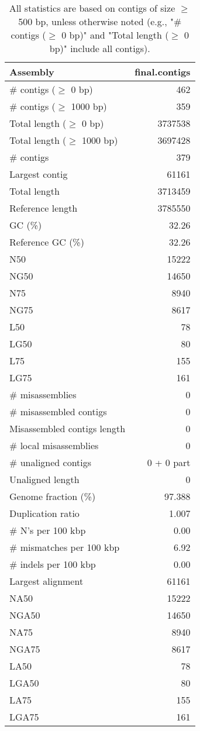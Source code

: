 \documentclass[12pt,a4paper]{article}
\begin{document}
\begin{table}[ht]
\begin{center}
\caption{All statistics are based on contigs of size $\geq$ 500 bp, unless otherwise noted (e.g., "\# contigs ($\geq$ 0 bp)" and "Total length ($\geq$ 0 bp)" include all contigs).}
\begin{tabular}{|l*{1}{|r}|}
\hline
Assembly & final.contigs \\ \hline
\# contigs ($\geq$ 0 bp) & 462 \\ \hline
\# contigs ($\geq$ 1000 bp) & 359 \\ \hline
Total length ($\geq$ 0 bp) & 3737538 \\ \hline
Total length ($\geq$ 1000 bp) & 3697428 \\ \hline
\# contigs & 379 \\ \hline
Largest contig & 61161 \\ \hline
Total length & 3713459 \\ \hline
Reference length & 3785550 \\ \hline
GC (\%) & 32.26 \\ \hline
Reference GC (\%) & 32.26 \\ \hline
N50 & 15222 \\ \hline
NG50 & 14650 \\ \hline
N75 & 8940 \\ \hline
NG75 & 8617 \\ \hline
L50 & 78 \\ \hline
LG50 & 80 \\ \hline
L75 & 155 \\ \hline
LG75 & 161 \\ \hline
\# misassemblies & 0 \\ \hline
\# misassembled contigs & 0 \\ \hline
Misassembled contigs length & 0 \\ \hline
\# local misassemblies & 0 \\ \hline
\# unaligned contigs & 0 + 0 part \\ \hline
Unaligned length & 0 \\ \hline
Genome fraction (\%) & 97.388 \\ \hline
Duplication ratio & 1.007 \\ \hline
\# N's per 100 kbp & 0.00 \\ \hline
\# mismatches per 100 kbp & 6.92 \\ \hline
\# indels per 100 kbp & 0.00 \\ \hline
Largest alignment & 61161 \\ \hline
NA50 & 15222 \\ \hline
NGA50 & 14650 \\ \hline
NA75 & 8940 \\ \hline
NGA75 & 8617 \\ \hline
LA50 & 78 \\ \hline
LGA50 & 80 \\ \hline
LA75 & 155 \\ \hline
LGA75 & 161 \\ \hline
\end{tabular}
\end{center}
\end{table}
\end{document}

